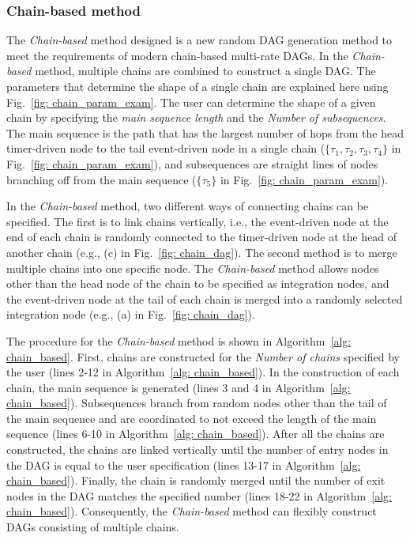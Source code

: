 \subsubsection{Chain-based method}
\label{sssec: chain_based_method}

The {\it Chain-based} method designed is a new random DAG generation method to meet the requirements of modern chain-based multi-rate DAGs.
In the {\it Chain-based} method, multiple chains are combined to construct a single DAG.
The parameters that determine the shape of a single chain are explained here using Fig.~\ref{fig: chain_param_exam}.
The user can determine the shape of a given chain by specifying the {\it main sequence length} and the {\it Number of subsequences}.
The main sequence is the path that has the largest number of hops from the head timer-driven node to the tail event-driven node in a single chain ($\{\tau_1, \tau_2, \tau_3, \tau_4\}$ in Fig.~\ref{fig: chain_param_exam}), and subsequences are straight lines of nodes branching off from the main sequence ($\{\tau_5\}$ in Fig.~\ref{fig: chain_param_exam}).

In the {\it Chain-based} method, two different ways of connecting chains can be specified.
The first is to link chains vertically, i.e., the event-driven node at the end of each chain is randomly connected to the timer-driven node at the head of another chain (e.g., (c) in Fig.~\ref{fig: chain_dag}).
The second method is to merge multiple chains into one specific node.
The {\it Chain-based} method allows nodes other than the head node of the chain to be specified as integration nodes, and the event-driven node at the tail of each chain is merged into a randomly selected integration node (e.g., (a) in Fig.~\ref{fig: chain_dag}).

The procedure for the {\it Chain-based} method is shown in Algorithm~\ref{alg: chain_based}.
First, chains are constructed for the {\it Number of chains} specified by the user (lines 2-12 in Algorithm~\ref{alg: chain_based}).
In the construction of each chain, the main sequence is generated (lines 3 and 4 in Algorithm~\ref{alg: chain_based}).
Subsequences branch from random nodes other than the tail of the main sequence and are coordinated to not exceed the length of the main sequence (lines 6-10 in Algorithm~\ref{alg: chain_based}).
After all the chains are constructed, the chains are linked vertically until the number of entry nodes in the DAG is equal to the user specification (lines 13-17 in Algorithm~\ref{alg: chain_based}).
Finally, the chain is randomly merged until the number of exit nodes in the DAG matches the specified number (lines 18-22 in Algorithm~\ref{alg: chain_based}).
Consequently, the {\it Chain-based} method can flexibly construct DAGs consisting of multiple chains.


